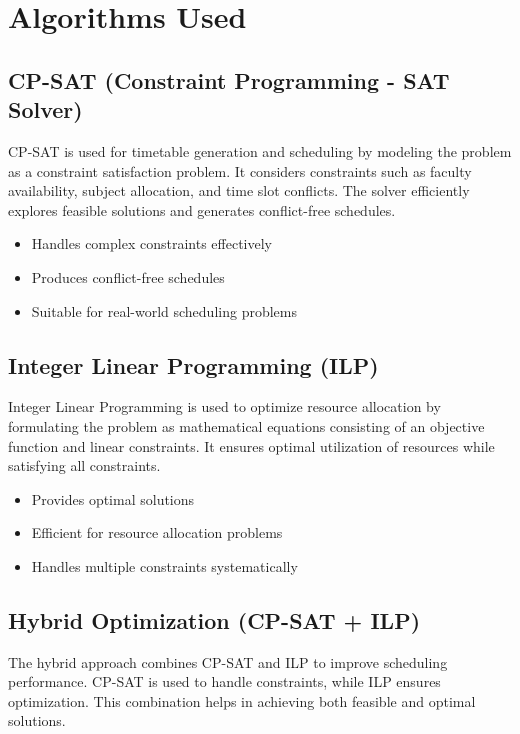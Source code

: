 \documentclass[a4paper, 12pt]{report}
\begin{document}
\section{Algorithms Used}

\subsection{CP-SAT (Constraint Programming - SAT Solver)}
CP-SAT is used for timetable generation and scheduling by modeling the problem as a constraint satisfaction problem. It considers constraints such as faculty availability, subject allocation, and time slot conflicts. The solver efficiently explores feasible solutions and generates conflict-free schedules.


\begin{itemize}
    \item Handles complex constraints effectively
    \item Produces conflict-free schedules
    \item Suitable for real-world scheduling problems
\end{itemize}


\subsection{Integer Linear Programming (ILP)}
Integer Linear Programming is used to optimize resource allocation by formulating the problem as mathematical equations consisting of an objective function and linear constraints. It ensures optimal utilization of resources while satisfying all constraints.


\begin{itemize}
    \item Provides optimal solutions
    \item Efficient for resource allocation problems
    \item Handles multiple constraints systematically
\end{itemize}


\subsection{Hybrid Optimization (CP-SAT + ILP)}
The hybrid approach combines CP-SAT and ILP to improve scheduling performance. CP-SAT is used to handle constraints, while ILP ensures optimization. This combination helps in achieving both feasible and optimal solutions.
\end{document}

